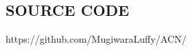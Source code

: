 \documentclass[a0,portrait]{a0poster}
\begin{document}
\begin{multicols}{2}

\color{SaddleBrown} %



\color{DarkSlateGray} %



\color{SaddleBrown}
\subsection*{SOURCE CODE}
\color{DarkSlateGray}
https://github.com/MugiwaraLuffy/ACN/


\nocite{*} %





\end{multicols}
\end{document}
